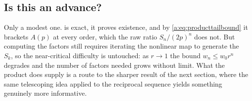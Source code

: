 \subsection{Is this an advance?}
\label{a:sec:isadvance}

Only a modest one.  is exact, it proves existence, and by
\cref{a:eq:producttailbound} it brackets $A(p)$ at every order, which the raw ratio
$S_n/(2p)^n$ does not. But computing the factors still requires iterating the
nonlinear map to generate the $S_k$, so the near-critical difficulty is untouched:
as $r\to1$ the bound $w_n\le w_0r^n$ degrades and the number of factors needed
grows without limit. What the product does supply is a route to the sharper result
of the next section, where the same telescoping idea applied to the reciprocal
sequence yields something genuinely more informative.
